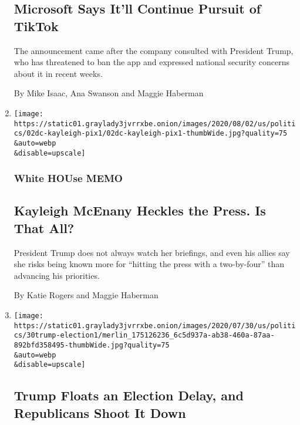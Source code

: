 \begin{enumerate}
  \hypertarget{microsoft-says-itll-continue-pursuit-of-tiktok}{%
  \subsection{Microsoft Says It'll Continue Pursuit of
  TikTok}\label{microsoft-says-itll-continue-pursuit-of-tiktok}}

  The announcement came after the company consulted with President
  Trump, who has threatened to ban the app and expressed national
  security concerns about it in recent weeks.

  By Mike Isaac, Ana Swanson and Maggie Haberman
\item
  \href{/2020/08/02/us/politics/kayleigh-mcenany.html}{}

  \texttt{[image: https://static01.graylady3jvrrxbe.onion/images/2020/08/02/us/politics/02dc-kayleigh-pix1/02dc-kayleigh-pix1-thumbWide.jpg?quality=75\\\&auto=webp\\\&disable=upscale]}

  \hypertarget{white-house-memo}{%
  \subsubsection{White HOUse MEMO}\label{white-house-memo}}

  \hypertarget{kayleigh-mcenany-heckles-the-press-is-that-all}{%
  \subsection{Kayleigh McEnany Heckles the Press. Is That
  All?}\label{kayleigh-mcenany-heckles-the-press-is-that-all}}

  President Trump does not always watch her briefings, and even his
  allies say she risks being known more for ``hitting the press with a
  two-by-four'' than advancing his priorities.

  By Katie Rogers and Maggie Haberman
\item
  \href{/2020/07/30/us/politics/trump-delay-2020-election.html}{}

  \texttt{[image: https://static01.graylady3jvrrxbe.onion/images/2020/07/30/us/politics/30trump-election1/merlin\_175126236\_6c5d937a-ab38-460a-87aa-892bfd358495-thumbWide.jpg?quality=75\\\&auto=webp\\\&disable=upscale]}

  \hypertarget{trump-floats-an-election-delay-and-republicans-shoot-it-down}{%
  \subsection{Trump Floats an Election Delay, and Republicans Shoot It
  Down}\label{trump-floats-an-election-delay-and-republicans-shoot-it-down}}


\end{enumerate}
